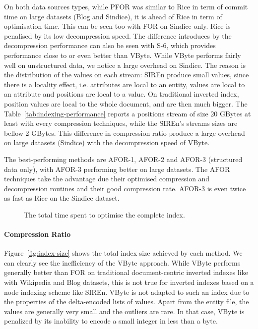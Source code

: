 On both data sources types, while PFOR was similar to Rice in term of commit
time on large datasets (Blog and Sindice), it is ahead of Rice in term of
optimisation time. This can be seen too with FOR on Sindice only. Rice is
penalised by its low decompression speed. The difference introduces by the
decompression performance can also be seen with S-6, which provides performance
close to or even better than VByte. While VByte performs fairly well on
unstructured data, we notice a large overhead on Sindice. The reason is the
distribution of the values on each stream: SIREn produce small values, since
there is a locality effect, i.e. attributes are local to an entity, values are
local to an attribute and positions are local to a value. On traditional
inverted index, position values are local to the whole document, and are then
much bigger. The Table~\ref{tab:indexing-performance} reports a positions
stream of size 20 GBytes at least with every compression techniques, while the
SIREn's streams sizes are bellow 2 GBytes. This difference in compression
ratio produce a large overhead on large datasets (Sindice) with the
decompression speed of VByte.

The best-performing methods are AFOR-1, AFOR-2 and AFOR-3 (structured data
only), with AFOR-3 performing better on large datasets. The AFOR techniques
take the advantage due their optimised compression and decompression routines
and their good compression rate. AFOR-3 is even twice as fast as Rice on the
Sindice dataset.

\begin{figure}
\centering
\begin{minipage}{0.8\linewidth}
  \centering
    \resizebox{0.7\linewidth}{!}{%
    
  }
  \quad
  \resizebox{\linewidth}{!}{%
    
  }
	\caption{The total time spent to optimise the complete index.}
	\label{fig:optimise-time}
\end{minipage}
\end{figure}

\paragraph{Compression Ratio}

Figure~\ref{fig:index-size} shows the total index size achieved by each
method. We can clearly see the inefficiency of the VByte approach. While VByte
performs generally better than FOR on traditional document-centric inverted
indexes like with Wikipedia and Blog datasets, this is not true for inverted
indexes based on a node indexing scheme like SIREn. VByte is not adapted to such
an index due to the properties of the delta-encoded lists of values. Apart
from the entity file, the values are generally very small and the outliers are
rare. In that case, VByte is penalized by its inability to encode a small
integer in less than a byte.

